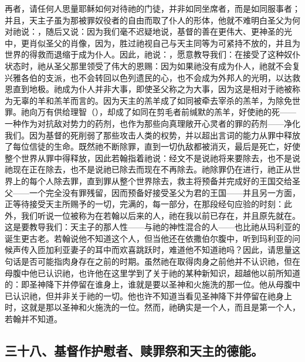 再者，请任何人思量耶稣如何对待祂的门徒，并非如同坐席者，而是如同服事者；并且，天主子虽为那被罪奴役者的自由而取了仆人的形体，他就不难明白圣父为何对祂说：，随后又说：因为我们毫不迟疑地说，基督的善在更伟大、更神圣的光中，更肖似圣父的肖像，因为，胜过祂视自己与天主同等为可紧持不放的，并且为世界的得救而退缩于成为仆人。因此，祂说：，愿意教导我们：在接受了这种奴仆状态时，祂从圣父那里领受了伟大的恩赐：因为如果祂没有成为仆人，祂就不会复兴雅各伯的支派，也不会转回以色列遗民的心，也不会成为外邦人的光明，以达救恩直到地极。祂成为仆人并非大事，即使圣父称之为大事，因为这是相对于祂被称为无辜的羊和羔羊而言的。因为天主的羔羊成了如同被牵去宰杀的羔羊，为除免世罪。祂向万有供给理智（），却成了如同在剪毛者前缄默的羔羊，好使祂的死——一种作为对抗敌对势力的药剂，也作为那些向真理敞开心灵者的罪的药剂——净化我们。因为基督的死削弱了那些攻击人类的权势，并以超出言词的能力从罪中释放了每位信徒的生命。既然祂不断除罪，直到一切仇敌都被消灭，最后是死亡，好使整个世界从罪中得释放，因此若翰指着祂说：经文不是说祂将来要除去，也不是说祂现在正在除去，也不是说祂已除去而现在不再除去。祂除罪仍在进行，祂正从世界上的每个人除去罪，直到罪从整个世界除去，救主将预备并完成好的王国交给圣父——一个完全没有罪残留，因而预备好接受圣父为君的王国——并且另一方面，正等待接受天主所赐予的一切，完满的，每一部分，在那段经句应验的时刻：此外，我们听说一位被称为在若翰以后来的人，祂在我以前已存在，并且原先就在。这是要教导我们：天主子的那人性——与祂的神性混合的人——也比祂从玛利亚的诞生更古老。若翰说他不知道这个人，但当他还在依撒伯尔腹中，听到玛利亚的问候声传入匝加利亚妻子的耳中而欢喜跳跃时，难道他不知道祂吗？因此，请思量这句话是否可能指肉身存在之前的时期。虽然祂在取得肉身之前他并不认识祂，但在母腹中他已认识祂，也许他在这里学到了关于祂的某种新知识，超越他以前所知道的：即圣神降下并停留在谁身上，谁就是要以圣神和火施洗的那一位。他从母腹中已认识祂，但并非关于祂的一切。他也许不知道当看见圣神降下并停留在祂身上时，这就是那以圣神和火施洗的一位。然而，祂确实是一个人，而且是第一个人，若翰并不知道。\par


\subsection{三十八、基督作护慰者、赎罪祭和天主的德能。}

